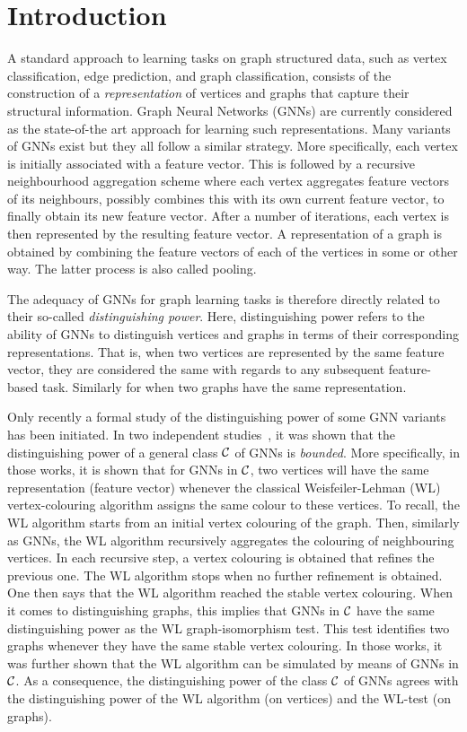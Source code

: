 \section{Introduction}\label{sec:intro}
A standard approach to learning tasks on graph structured data, such as vertex classification, edge prediction, and  graph classification, consists of the construction of a \textit{representation} of vertices and graphs that capture their structural information. Graph Neural Networks (GNNs) are currently considered as the state-of-the art approach for learning such representations. Many variants of GNNs exist but they all follow a similar strategy. More specifically,  each vertex is initially associated with a feature vector. This is followed by a recursive neighbourhood aggregation scheme where each vertex aggregates feature vectors of its neighbours, possibly combines this with its own current feature vector, to finally obtain its new feature vector. After a number of iterations, each vertex is then represented by the resulting feature vector. A representation of a graph is  obtained by combining the feature vectors of each of the vertices in some or other way. The latter process is also called pooling. 

The adequacy of GNNs for graph learning tasks is therefore directly related to their so-called \textit{distinguishing power}. Here, distinguishing power refers to the ability of GNNs to distinguish vertices and graphs in terms of their corresponding representations. That is, when two vertices are represented by the same feature vector, they are considered the same with regards to any subsequent feature-based task. Similarly for when two graphs have the same representation.

Only recently a formal study of the distinguishing power of some GNN variants has been initiated. In two independent studies~\cite{xhlj19,grohewl}, it was shown that the distinguishing power of a general class ${\cal C}$ of GNNs is \textit{bounded}. More specifically, in those works, it is shown that for GNNs in ${\cal C}$, two vertices will have the same representation (feature vector) whenever the classical Weisfeiler-Lehman (WL) vertex-colouring algorithm assigns the same colour to these vertices. To recall, the WL algorithm starts from an initial vertex colouring of the graph. Then, similarly as GNNs, the WL algorithm recursively aggregates the colouring of neighbouring vertices. In each recursive step, a vertex colouring is obtained that refines the previous one. The WL algorithm stops when no further refinement is obtained. One then says that the WL algorithm reached the stable vertex colouring. When it comes to distinguishing  graphs, this implies that GNNs in ${\cal C}$ have the same distinguishing power as the WL graph-isomorphism test. This test identifies two graphs whenever they have the same stable vertex colouring. 
In those works, it was further shown that the WL algorithm can be simulated by means of GNNs in ${\cal C}$. As a consequence, the distinguishing power of the class ${\cal C}$ of GNNs agrees with the distinguishing power of the WL algorithm (on vertices) and the WL-test (on graphs).

